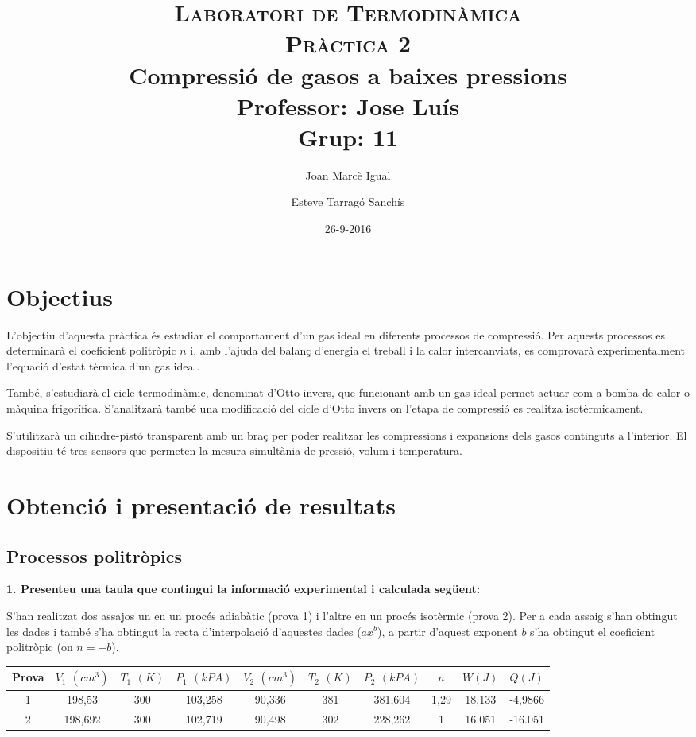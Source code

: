 \documentclass[a4paper]{article}
\title{
    \textsc{Laboratori de Termodinàmica} \\
    \textsc{Pràctica 2} \\
    Compressió de gasos a baixes pressions \\
    \large
    Professor: Jose Luís \\ Grup: 11 }
\author{Joan Marcè Igual \and Esteve Tarragó Sanchís}
\date{26-9-2016}
\begin{document}
\maketitle

\section*{Objectius}

L'objectiu d'aquesta pràctica és estudiar el comportament d'un gas ideal en diferents processos de compressió. Per aquests processos es determinarà el coeficient politròpic $n$ i, amb l'ajuda del balanç d'energia el treball i la calor intercanviats, es comprovarà experimentalment l'equació d'estat tèrmica d'un gas ideal. 

També, s'estudiarà el cicle termodinàmic, denominat d'Otto invers, que funcionant amb un gas ideal permet actuar com a bomba de calor o màquina frigorífica. S'analitzarà també una modificació del cicle d'Otto invers on l'etapa de compressió es realitza isotèrmicament.

S'utilitzarà un cilindre-pistó transparent amb un braç per poder realitzar les compressions i expansions dels gasos continguts a l'interior. El dispositiu té tres sensors que permeten la mesura simultània de pressió, volum i temperatura.

\section*{Obtenció i presentació de resultats}

\subsection*{Processos politròpics}

\textbf{1. Presenteu una taula que contingui la informació experimental i calculada següent:}

S'han realitzat dos assajos un en un procés adiabàtic (prova 1) i l'altre en un procés isotèrmic (prova 2). Per a cada assaig s'han obtingut les dades i també s'ha obtingut la recta d'interpolació d'aquestes dades ($ax^b$), a partir d'aquest exponent $b$ s'ha obtingut el coeficient politròpic (on $n = -b$).
\begin{center}
\begin{tabular}{c|ccccccccc}
    Prova & $V_1$ $(cm^3)$ & $T_1$ $(K)$ & $P_1$ $(kPA)$ & $V_2$ $(cm^3)$ & $T_2$ $(K)$ & $P_2$ $(kPA)$ & $n$ & $W(J)$ & $Q(J)$ \\
    \hline
    1 & 198,53 & 300 & 103,258 & 90,336 & 381 & 381,604 & 1,29 & 18,133 & -4,9866 \\
    2 & 198,692 & 300 & 102,719 & 90,498 & 302 & 228,262 & 1 & 16.051 & -16.051
\end{tabular}
\end{center}
\end{document}
